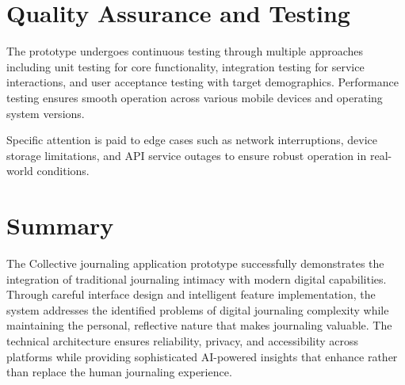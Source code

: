 \section{Quality Assurance and Testing}

The prototype undergoes continuous testing through multiple approaches including unit testing for core functionality, integration testing for service interactions, and user acceptance testing with target demographics. Performance testing ensures smooth operation across various mobile devices and operating system versions.

Specific attention is paid to edge cases such as network interruptions, device storage limitations, and API service outages to ensure robust operation in real-world conditions.

\section{Summary}

The Collective journaling application prototype successfully demonstrates the integration of traditional journaling intimacy with modern digital capabilities. Through careful interface design and intelligent feature implementation, the system addresses the identified problems of digital journaling complexity while maintaining the personal, reflective nature that makes journaling valuable. The technical architecture ensures reliability, privacy, and accessibility across platforms while providing sophisticated AI-powered insights that enhance rather than replace the human journaling experience.
